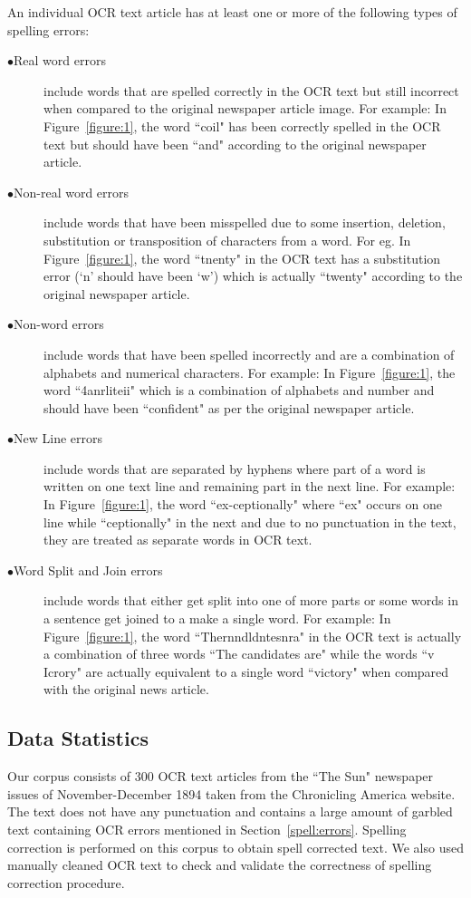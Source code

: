 \documentclass[preprint,11pt]{elsarticle}
\begin{document}
 An individual OCR text article has at least one or more of the following types of spelling errors:
\begin{description}
 \item[$\bullet$Real word errors] include words that are spelled correctly in the OCR text but still incorrect when compared to the original newspaper article image. For example: In Figure~\ref{figure:1}, the word ``coil"  has been correctly spelled in the OCR text  but should have been ``and" according to the original newspaper article. 
 \item[$\bullet$Non-real word errors] include words that have been misspelled due to some insertion, deletion, substitution or transposition of characters from a word. For eg. In Figure~\ref{figure:1}, the word ``tnenty" in the OCR text has a substitution error (`n' should have been `w') which is actually ``twenty" according to the original newspaper article.
 \item[$\bullet$Non-word errors] include words that have been spelled incorrectly and are a combination of alphabets and numerical characters. For example: In Figure~\ref{figure:1}, the word ``4anrliteii" which is a combination of alphabets and number and should have been ``confident" as per the original newspaper article.
\item[$\bullet$New Line errors] include words that are separated by hyphens where part of a word is written on one text line and remaining part in the next line. For example: In Figure~\ref{figure:1}, the word ``ex-ceptionally" where ``ex" occurs on one line while ``ceptionally" in the next and due to no punctuation in the text, they are treated as separate words in OCR text.
\item[$\bullet$Word Split and Join errors] include words that either get split into one of more parts or some words in a sentence get joined to a make a single word. For example: In Figure~\ref{figure:1}, the word ``Thernndldntesnra" in the OCR text is actually a combination of three words ``The candidates are" while the words ``v Icrory" are actually equivalent to a single word ``victory" when compared with the original news article.
\end{description} 

\subsection{Data Statistics}
Our corpus consists of 300 OCR text articles from the ``The Sun" newspaper issues of November-December 1894 taken from the Chronicling America website. The text does not have any punctuation and contains a large amount of garbled text containing OCR errors mentioned in Section~\ref{spell:errors}.
 Spelling correction is performed on this corpus to obtain spell corrected text. We also used manually cleaned OCR text to check and validate the correctness of spelling correction procedure. 
\end{document}
